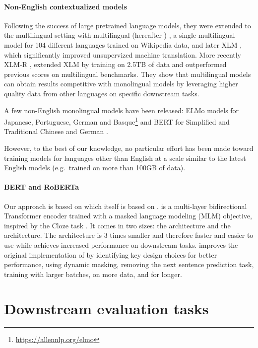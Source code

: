 \paragraph{Non-English contextualized models}
\label{contextualmodelsforotherlanguages}
Following the success of large pretrained language models, they were extended to the multilingual setting with multilingual \bert (hereafter \mbert) \cite{devlin-etal-2019-bert}, a single multilingual model for 104 different languages trained on Wikipedia data, and later XLM \cite{conneau-lample-2019-cross}, which significantly improved unsupervized machine translation.
More recently XLM-R \cite{conneau-etal-2020-unsupervised}, extended XLM by training on 2.5TB of data and outperformed previous scores on multilingual benchmarks. They show that multilingual models can obtain results competitive with monolingual models by leveraging higher quality data from other languages on specific downstream tasks.

A few non-English monolingual models have been released: ELMo models for Japanese, Portuguese, German and Basque\footnote{\url{https://allennlp.org/elmo}} and BERT for Simplified and Traditional Chinese \cite{devlin-etal-2019-bert} and German \cite{chan-etal-2019-german}.

However, to the best of our knowledge, no particular effort has been made toward training models for languages other than English at a scale similar to the latest English models (e.g.~\roberta trained on more than 100GB of data).

\paragraph{BERT and RoBERTa}
Our approach is based on \roberta \cite{liu-etal-2019-roberta} which itself is based on \bert \cite{devlin-etal-2019-bert}.
\bert is a multi-layer bidirectional Transformer encoder trained with a masked language modeling (MLM) objective, inspired by the Cloze task \cite{taylor-1953-cloze}.
It comes in two sizes: the \bertbase architecture and the \bertlarge architecture. The \bertbase architecture is 3 times smaller and therefore faster and easier to use while \bertlarge achieves increased performance on downstream tasks.
\roberta improves the original implementation of \bert by identifying key design choices for better performance, using dynamic masking, removing the next sentence prediction task, training with larger batches, on more data, and for longer.


\section{Downstream evaluation tasks}

